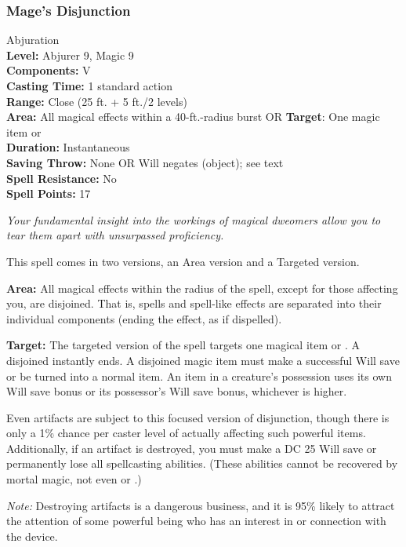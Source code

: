 \subsubsection{Mage's Disjunction}
\label{Spell:Disjunction}
Abjuration
\\ \textbf{Level:} Abjurer 9, Magic 9
\\ \textbf{Components:} V
\\ \textbf{Casting Time:} 1 standard action
\\ \textbf{Range:} Close (25 ft. + 5 ft./2 levels)
\\ \textbf{Area:} All magical effects within a 40-ft.-radius burst OR \textbf{Target}: One magic item or 
\\ \textbf{Duration:} Instantaneous
\\ \textbf{Saving Throw:} None OR Will negates (object); see text
\\ \textbf{Spell Resistance:} No
\\ \textbf{Spell Points:} 17

\emph{Your fundamental insight into the workings of magical dweomers allow you to tear them apart with unsurpassed proficiency.}

This spell comes in two versions, an Area version and a Targeted version.

\begin{list}{}{\leftmargin=1em}
 \item \textbf{Area:} All magical effects within the radius of the spell, except for those affecting you, are disjoined.
That is, spells and spell-like effects are separated into their individual components (ending the effect, as if dispelled). 
 \item \textbf{Target:} The targeted version of the spell targets one magical item or .
A disjoined  instantly ends.
A disjoined magic item must make a successful Will save or be turned into a normal item. 
An item in a creature's possession uses its own Will save bonus or its possessor's Will save bonus, whichever is higher.

Even artifacts are subject to this focused version of disjunction, though there is only a 1\% chance per caster level of actually affecting such powerful items. 
Additionally, if an artifact is destroyed, you must make a DC 25 Will save or permanently lose all spellcasting abilities. 
(These abilities cannot be recovered by mortal magic, not even  or .)

\emph{Note:} Destroying artifacts is a dangerous business, and it is 95\% likely to attract the attention of some powerful being who has an interest in or connection with the device. 
\end{list}
